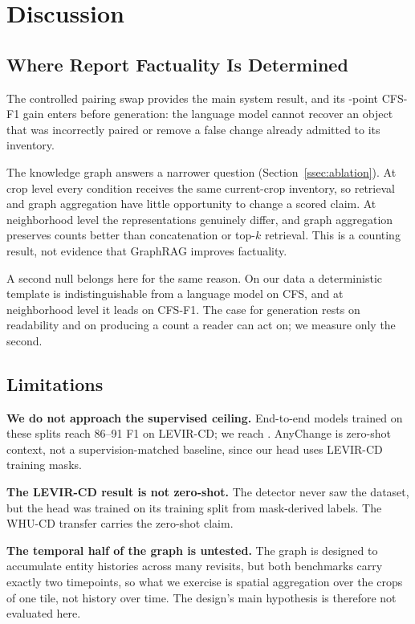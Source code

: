 \section{Discussion}

\subsection{Where Report Factuality Is Determined}

The controlled pairing swap provides the main system result, and its
\EFiveGain-point CFS-F1 gain enters before generation: the language model
cannot recover an object that was incorrectly paired or remove a false change
already admitted to its inventory.

The knowledge graph answers a narrower question (Section~\ref{ssec:ablation}).
At crop level every condition receives the same current-crop inventory, so
retrieval and graph aggregation have little opportunity to change a scored
claim. At neighborhood level the representations genuinely differ, and graph
aggregation preserves counts better than concatenation or top-$k$ retrieval.
This is a counting result, not evidence that GraphRAG improves factuality.

A second null belongs here for the same reason. On our data a deterministic
template is indistinguishable from a language model on CFS, and at
neighborhood level it leads on CFS-F1. The case for generation rests on
readability and on producing a count a reader can act on; we measure only the
second.

\subsection{Limitations}

\textbf{We do not approach the supervised ceiling.} End-to-end models trained
on these splits reach 86--91 F1 on LEVIR-CD; we reach \EOnePixelFOne. AnyChange
is zero-shot context, not a supervision-matched baseline, since our head uses
LEVIR-CD training masks.

\textbf{The LEVIR-CD result is not zero-shot.} The detector never saw the
dataset, but the head was trained on its training split from mask-derived
labels. The WHU-CD transfer carries the zero-shot claim.

\textbf{The temporal half of the graph is untested.} The graph is designed to
accumulate entity histories across many revisits, but both benchmarks carry
exactly two timepoints, so what we exercise is spatial aggregation over the
crops of one tile, not history over time. The design's main hypothesis is
therefore not evaluated here.

